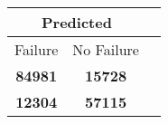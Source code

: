 \begin{tabular} 
 {@{}ccc@{}} 
\toprule 
\multicolumn{2}{c}{\textbf{Predicted}}
 \\ \midrule 
\multicolumn{1}{|c|}{Failure} & 
\multicolumn{1}{c|}{No Failure}
 \\ \midrule 
\multicolumn{1}{|c|}{\color{green}\textbf{84981}} & 
\multicolumn{1}{c|}{\color{red}\textbf{15728}}
 \\ \midrule 
\multicolumn{1}{|c|}{\color{red}\textbf{12304}} & 
\multicolumn{1}{c|}{\color{green}\textbf{57115}}
 \\ \bottomrule 
\end{tabular} 

